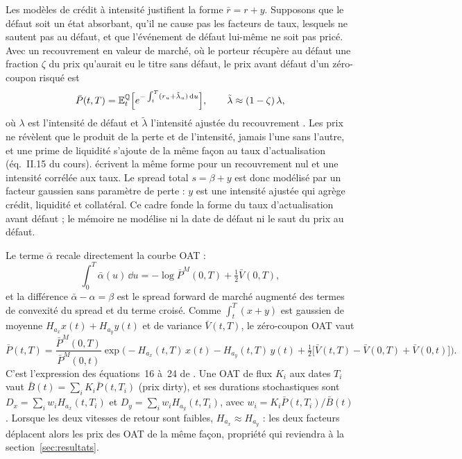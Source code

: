 Les modèles de crédit à intensité justifient la forme $\bar r = r + y$. Supposons que le défaut soit un état
absorbant, qu'il ne cause pas les facteurs de taux, lesquels ne sautent pas au défaut, et que l'événement de
défaut lui-même ne soit pas pricé. Avec un recouvrement en valeur de marché, où le porteur récupère au défaut une
fraction $\zeta$ du prix qu'aurait eu le titre sans défaut, le prix avant défaut d'un zéro-coupon risqué est
\begin{equation}
\bar P(t,T) = \mathbb{E}^{\mathbb{Q}}_t\Big[e^{-\int_t^T (r_u + \tilde\lambda_u)\,\mathrm{d} u}\Big],\qquad \tilde\lambda \approx (1-\zeta)\,\lambda,
\end{equation}
où $\lambda$ est l'intensité de défaut et $\tilde\lambda$ l'intensité ajustée du recouvrement
\citep[cours~5, hypothèses~II.1-II.3 et prop.~II.1-II.2]{DuffieSingleton1999,MPR2025}. Les prix ne
révèlent que le produit de la perte et de l'intensité, jamais l'une sans l'autre, et une prime de liquidité
s'ajoute de la même façon au taux d'actualisation (éq.~II.15 du cours). \citet[section~22.4]{BrigoMercurio2006}
écrivent la même forme pour un recouvrement nul et une intensité corrélée aux taux. Le spread total $s = \beta + y$
est donc modélisé par un facteur gaussien sans paramètre de perte : $y$ est une intensité ajustée qui agrège
crédit, liquidité et collatéral. Ce cadre fonde la forme du taux d'actualisation avant défaut ; le mémoire ne
modélise ni la date de défaut ni le saut du prix au défaut.

Le terme $\bar\alpha$ recale directement la courbe OAT \citep[corollaire~4.2.1, éq.~4.13]{BrigoMercurio2006} :
\begin{equation}
\int_0^T\bar\alpha(u)\,\dd u = -\log\bar P^M(0,T) + \tfrac12\bar V(0,T),
\label{eq:recalage}
\end{equation}
et la différence $\bar\alpha - \alpha = \beta$ est le spread forward de marché augmenté des termes de convexité du
spread et du terme croisé. Comme $\int_t^T(x+y)$ est gaussien de moyenne $H_{a_x}x(t) + H_{a_y}y(t)$ et de
variance $\bar V(t,T)$, le zéro-coupon OAT vaut \citep[théorème~4.2.1]{BrigoMercurio2006}
\begin{equation}
\bar P(t,T) = \frac{\bar P^M(0,T)}{\bar P^M(0,t)}\exp\Big(-H_{a_x}(t,T)\,x(t) - H_{a_y}(t,T)\,y(t)
+ \tfrac12\big[\bar V(t,T) - \bar V(0,T) + \bar V(0,t)\big]\Big).
\label{eq:zc_oat}
\end{equation}
C'est l'expression des équations~16 à~24 de \citet{Russo}. Une OAT de flux $K_i$ aux dates $T_i$ vaut
$\bar B(t) = \sum_i K_i \bar P(t,T_i)$ (prix dirty), et ses durations stochastiques sont
$D_x = \sum_i w_i H_{a_x}(t,T_i)$ et $D_y = \sum_i w_i H_{a_y}(t,T_i)$, avec $w_i = K_i\bar P(t,T_i)/\bar B(t)$.
Lorsque les deux vitesses de retour sont faibles, $H_{a_x} \approx H_{a_y}$ : les deux facteurs déplacent alors
les prix des OAT de la même façon, propriété qui reviendra à la section~\ref{sec:resultats}.
